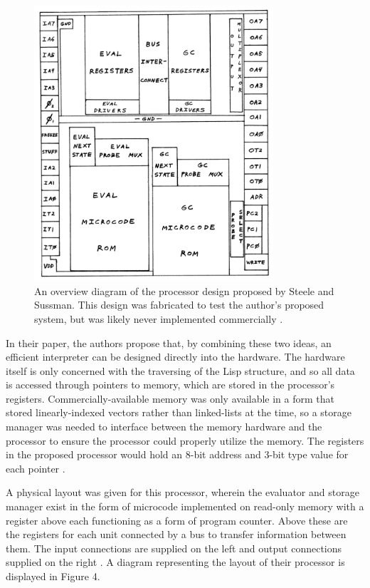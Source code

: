 \documentclass[journal]{IEEEtran}
\begin{document}
\begin{figure}[!t]
	\centering
	\includegraphics[width=3.5in]{SS_Processor_Diagram}
	\caption{An overview diagram of the processor design proposed by Steele and Sussman. This design was fabricated to test the author's proposed system, but was likely never implemented commercially \cite{ss}.}
	\label{Data representation}
\end{figure}


In their paper, the authors propose that, by combining these two ideas, an efficient interpreter can be designed directly into the hardware. The hardware itself is only concerned with the traversing of the Lisp structure, and so all data is accessed through pointers to memory, which are stored in the processor's registers. Commercially-available memory was only available in a form that stored linearly-indexed vectors rather than linked-lists at the time, so a storage manager was needed to interface between the memory hardware and the processor to ensure the processor could properly utilize the memory. The registers in the proposed processor would hold an 8-bit address and 3-bit type value for each pointer \cite{ss}.

A physical layout was given for this processor, wherein the evaluator and storage manager exist in the form of microcode implemented on read-only memory with a register above each functioning as a form of program counter. Above these are the registers for each unit connected by a bus to transfer information between them. The input connections are supplied on the left and output connections supplied on the right \cite{ss}. A diagram representing the layout of their processor is displayed in Figure 4.
\end{document}
